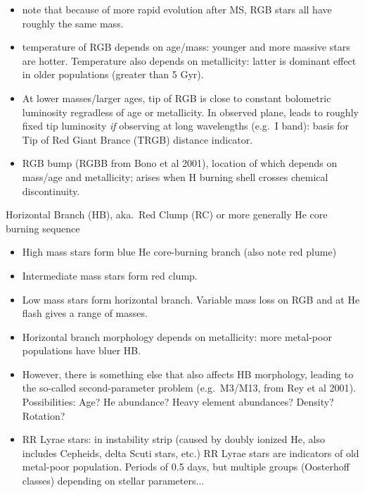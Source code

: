 \documentclass{article}
\begin{document}
        \begin{itemize}
            \item note that because of more rapid evolution after MS,
                RGB stars all have roughly the same mass.
            \item temperature of RGB depends on age/mass: younger and more
                massive stars are hotter. Temperature also depends on
                metallicity: latter is dominant effect in older populations
                (greater than 5 Gyr).
            \item At lower masses/larger ages, tip of RGB is close to
                constant bolometric luminosity regradless of age or
                metallicity. In observed plane, leads to roughly fixed
                tip luminosity \emph{if} observing at long wavelengths
                (e.g.\ I band): basis for Tip of Red Giant Brance (TRGB)
                distance indicator.
            \item RGB bump (RGBB from
                Bono et al 2001),
                location of which depends on mass/age and metallicity;
                arises when H burning shell crosses chemical discontinuity.
        \end{itemize}
    \item Horizontal Branch (HB), aka.\ Red Clump (RC) or more generally
        He core burning sequence
        \begin{itemize}
            \item High mass stars form blue He core-burning branch
                (also note red plume)
            \item Intermediate mass stars form red clump.
            \item Low mass stars form horizontal branch. Variable mass loss
                on RGB and at He flash gives a range of masses.
            \item Horizontal branch morphology depends on metallicity: more
                metal-poor populations have bluer HB.
            \item However, there is something else that also affects HB
                morphology, leading to the so-called second-parameter problem
                (e.g.\ {M3/M13}, from {Rey et al
                2001}). Possibilities: Age? He abundance? Heavy element
                abundances? Density? Rotation?
            \item RR Lyrae stars: in instability strip (caused by doubly
                ionized He, also includes Cepheids, delta Scuti stars, etc.)
                RR Lyrae stars are indicators of old metal-poor population.
                Periods of 0.5 days, but multiple groups (Oosterhoff classes)
                depending on stellar parameters$\ldots$
        \end{itemize}
\end{document}
